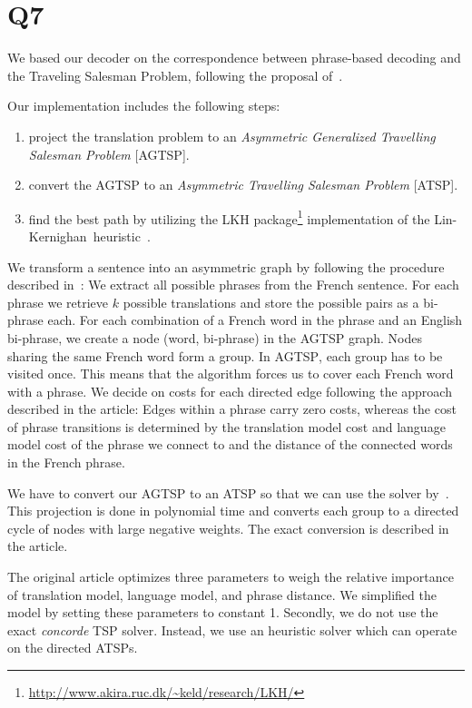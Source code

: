 \section*{Q7}

We based our decoder on the correspondence between phrase-based decoding and
the Traveling Salesman Problem, following the proposal
of~\cite{zaslavskiy2009}.

Our implementation includes the following steps:
\begin{enumerate}
    \item project the translation problem to an \emph{Asymmetric Generalized
        Travelling Salesman Problem} [\textsc{AGTSP}].
    \item convert the \textsc{AGTSP} to an \emph{Asymmetric Travelling
        Salesman Problem} [\textsc{ATSP}].
    \item find the best path by utilizing the LKH
        package\footnote{\url{http://www.akira.ruc.dk/~keld/research/LKH/}}
        implementation of the Lin-Kernighan~heuristic~\cite{Helsgaun2006}.
\end{enumerate}

We transform a sentence into an asymmetric graph by following the procedure
described in~\cite{zaslavskiy2009}: We extract all possible phrases from the
French sentence. For each phrase we retrieve $k$ possible translations and
store the possible pairs as a bi-phrase each. For each combination of a French word in the
phrase and an English bi-phrase, we create a node (word, bi-phrase) in the
\textsc{AGTSP} graph. Nodes sharing the same French word form a group. In
\textsc{AGTSP}, each group has to be visited once. This means that the
algorithm forces us to cover each French word with a phrase. We decide on
costs for each directed edge following the approach described in the
article: Edges within a phrase carry zero costs, whereas the cost of phrase
transitions is determined by the translation model cost and language model
cost of the phrase we connect to and the distance of the connected words in
the French phrase.

We have to convert our \textsc{AGTSP} to an \textsc{ATSP} so that we can use
the solver by~\cite{Helsgaun2006}. This projection is done in polynomial
time and converts each group to a directed cycle of nodes with large
negative weights. The exact conversion is described in the article.

The original article optimizes three parameters to weigh the relative
importance of translation model, language model, and phrase distance.
We simplified the model by setting these parameters to constant 1. Secondly,
we do not use the exact \emph{concorde} \textsc{TSP} solver. Instead, we use
an heuristic solver which can operate on the directed \textsc{ATSP}s.

